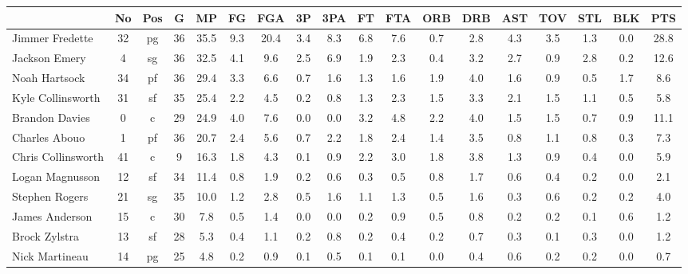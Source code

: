 \documentclass[10pt,letterpaper]{article}
\begin{document}
\begin{table}[ht]
\begin{center}
\begin{tabular}{lccccccccccccccccc}
  \hline
 & No & Pos & G & MP & FG & FGA & 3P & 3PA & FT & FTA & ORB & DRB & AST & TOV & STL & BLK & PTS \\ 
  \hline
Jimmer Fredette & 32 & pg & 36 & 35.5 & 9.3 & 20.4 & 3.4 & 8.3 & 6.8 & 7.6 & 0.7 & 2.8 & 4.3 & 3.5 & 1.3 & 0.0 & 28.8 \\ 
  Jackson Emery & 4 & sg & 36 & 32.5 & 4.1 & 9.6 & 2.5 & 6.9 & 1.9 & 2.3 & 0.4 & 3.2 & 2.7 & 0.9 & 2.8 & 0.2 & 12.6 \\ 
  Noah Hartsock & 34 & pf & 36 & 29.4 & 3.3 & 6.6 & 0.7 & 1.6 & 1.3 & 1.6 & 1.9 & 4.0 & 1.6 & 0.9 & 0.5 & 1.7 & 8.6 \\ 
  Kyle Collinsworth & 31 & sf & 35 & 25.4 & 2.2 & 4.5 & 0.2 & 0.8 & 1.3 & 2.3 & 1.5 & 3.3 & 2.1 & 1.5 & 1.1 & 0.5 & 5.8 \\ 
  Brandon Davies & 0 & c & 29 & 24.9 & 4.0 & 7.6 & 0.0 & 0.0 & 3.2 & 4.8 & 2.2 & 4.0 & 1.5 & 1.5 & 0.7 & 0.9 & 11.1 \\ 
  Charles Abouo & 1 & pf & 36 & 20.7 & 2.4 & 5.6 & 0.7 & 2.2 & 1.8 & 2.4 & 1.4 & 3.5 & 0.8 & 1.1 & 0.8 & 0.3 & 7.3 \\ 
  Chris Collinsworth & 41 & c & 9 & 16.3 & 1.8 & 4.3 & 0.1 & 0.9 & 2.2 & 3.0 & 1.8 & 3.8 & 1.3 & 0.9 & 0.4 & 0.0 & 5.9 \\ 
  Logan Magnusson & 12 & sf & 34 & 11.4 & 0.8 & 1.9 & 0.2 & 0.6 & 0.3 & 0.5 & 0.8 & 1.7 & 0.6 & 0.4 & 0.2 & 0.0 & 2.1 \\ 
  Stephen Rogers & 21 & sg & 35 & 10.0 & 1.2 & 2.8 & 0.5 & 1.6 & 1.1 & 1.3 & 0.5 & 1.6 & 0.3 & 0.6 & 0.2 & 0.2 & 4.0 \\ 
  James Anderson & 15 & c & 30 & 7.8 & 0.5 & 1.4 & 0.0 & 0.0 & 0.2 & 0.9 & 0.5 & 0.8 & 0.2 & 0.2 & 0.1 & 0.6 & 1.2 \\ 
  Brock Zylstra & 13 & sf & 28 & 5.3 & 0.4 & 1.1 & 0.2 & 0.8 & 0.2 & 0.4 & 0.2 & 0.7 & 0.3 & 0.1 & 0.3 & 0.0 & 1.2 \\ 
  Nick Martineau & 14 & pg & 25 & 4.8 & 0.2 & 0.9 & 0.1 & 0.5 & 0.1 & 0.1 & 0.0 & 0.4 & 0.6 & 0.2 & 0.2 & 0.0 & 0.7 \\ 
   \hline
\end{tabular}
\end{center}
\end{table}
\end{document}
